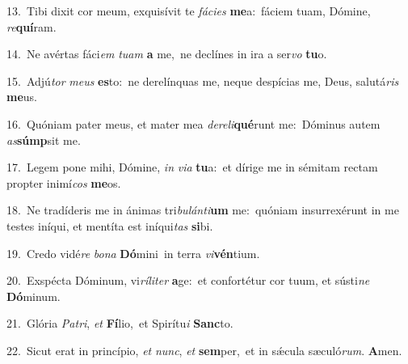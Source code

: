 {\numbfont\textcolor{\numbcolor}{13.}}~Tibi dixit cor meum, exquisívit te \textit{fá}\-\textit{ci}\textit{es} \textbf{me}\-a:~\star fáciem tuam, Dómine, \textit{re}\-\textbf{quí}ram.\par
{\numbfont\textcolor{\numbcolor}{14.}}~Ne avértas fáci\textit{em} \textit{tu}\-\textit{am} \textbf{a} me,~\star ne declínes in ira a ser\textit{vo} \textbf{tu}\-o.\par
{\numbfont\textcolor{\numbcolor}{15.}}~Adjú\textit{tor} \textit{me}\-\textit{us} \textbf{es}\-to:~\star ne derelínquas me, neque despícias me, Deus, salutá\textit{ris} \textbf{me}\-us.\par
{\numbfont\textcolor{\numbcolor}{16.}}~Quóniam pater meus, et mater mea \textit{de}\-\textit{re}\textit{li}\textbf{qué}runt me:~\star Dóminus autem \textit{as}\-\textbf{súmp}sit me.\par
{\numbfont\textcolor{\numbcolor}{17.}}~Legem pone mihi, Dómine, \textit{in} \textit{vi}\-\textit{a} \textbf{tu}\-a:~\star et dírige me in sémitam rectam propter inimí\textit{cos} \textbf{me}\-os.\par
{\numbfont\textcolor{\numbcolor}{18.}}~Ne tradíderis me in ánimas tri\-\textit{bu}\-\textit{lán}\textit{ti}\textbf{um} me:~\star quóniam insurrexérunt in me testes iníqui, et mentíta est iníqui\textit{tas} \textbf{si}\-bi.\par
{\numbfont\textcolor{\numbcolor}{19.}}~Credo vidé\textit{re} \textit{bo}\-\textit{na} \textbf{Dó}\-mini~\star in terra \textit{vi}\-\textbf{vén}tium.\par
{\numbfont\textcolor{\numbcolor}{20.}}~Exspécta Dóminum, vi\-\textit{rí}\-\textit{li}\textit{ter} \textbf{a}\-ge:~\star et confortétur cor tuum, et sústi\textit{ne} \textbf{Dó}\-minum.\par
{\numbfont\textcolor{\numbcolor}{21.}}~Glória \textit{Pa}\-\textit{tri}, \textit{et} \textbf{Fí}\-lio,~\star et Spirítu\textit{i} \textbf{Sanc}\-to.\par
{\numbfont\textcolor{\numbcolor}{22.}}~Sicut erat in princípio, \textit{et} \textit{nunc}\-, \textit{et} \textbf{sem}\-per,~\star et in sǽcula sæculó\-\textit{rum}\-. \textbf{A}\-men.\par
